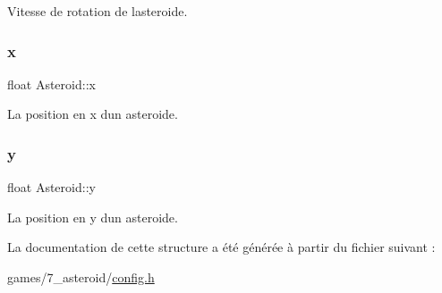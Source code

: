 Vitesse de rotation de l\textquotesingle{}asteroide. 

\mbox{\label{struct_asteroid_a3b05c8b9f528323c232c38f103071917}} 
\subsubsection{\texorpdfstring{x}{x}}
{\footnotesize\ttfamily float Asteroid\+::x}



La position en x d\textquotesingle{}un asteroide. 

\mbox{\label{struct_asteroid_a57a2284d0f05d0d32275269b2dca2f6c}} 
\subsubsection{\texorpdfstring{y}{y}}
{\footnotesize\ttfamily float Asteroid\+::y}



La position en y d\textquotesingle{}un asteroide. 



La documentation de cette structure a été générée à partir du fichier suivant \+:\begin{DoxyCompactItemize}
\item 
games/7\+\_\+asteroid/\hyperlink{7__asteroid_2config_8h}{config.\+h}\end{DoxyCompactItemize}
